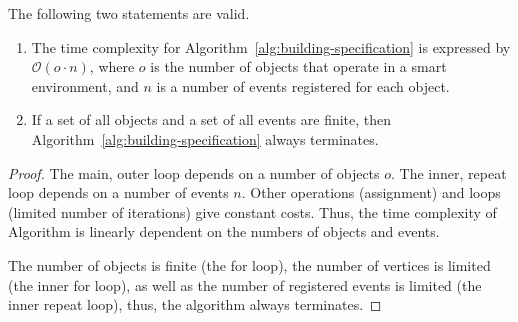 \documentclass[runningheads,a4paper]{llncs}
\begin{document}
\begin{corollary}
\label{cor:algorithm-1}
The following two statements are valid.
\begin{enumerate}
  \item
The time complexity for Algorithm~\ref{alg:building-specification} is expressed by
$\mathcal{O}(o \cdot n)$,
where $o$ is the number of objects that operate in a smart environment,
and $n$ is a number of events registered for each object.
  \item
If a set of all objects and a set of all events are finite,
then Algorithm~\ref{alg:building-specification} always terminates.
\end{enumerate}
\end{corollary}
\begin{proof}
The main, outer loop depends on a number of objects $o$.
The inner, repeat loop depends on a number of events $n$.
Other operations (assignment) and loops (limited number of iterations) give constant costs.
Thus, the time complexity of Algorithm is linearly dependent on the numbers of objects and events.

The number of objects is finite (the for loop),
the number of vertices is limited (the inner for loop),
as well as the number of registered events is limited (the inner repeat loop),
thus, the algorithm always terminates.
\end{proof}
\end{document}
